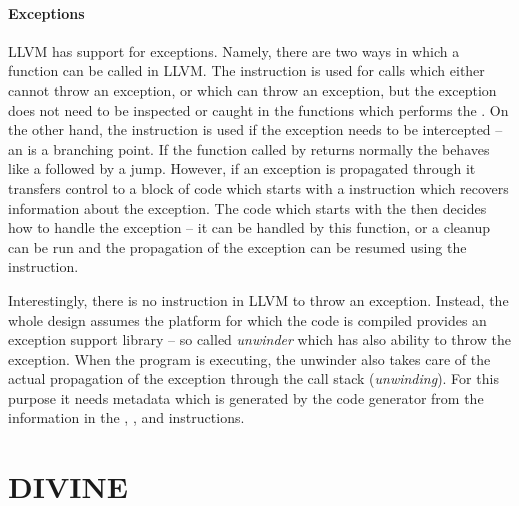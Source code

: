 \paragraph{Exceptions}

LLVM has support for exceptions.
Namely, there are two ways in which a function can be called in LLVM.
The  instruction is used for calls which either cannot throw an
exception, or which can throw an exception, but the exception does not need to
be inspected or caught in the functions which performs the .
On the other hand, the  instruction is used if the exception needs
to be intercepted -- an  is a branching point.
If the function called by  returns normally the  behaves
like a  followed by a jump.
However, if an exception is propagated through  it transfers control
to a block of code which starts with a  instruction which
recovers information about the exception.
The code which starts with the  then decides how to handle the
exception -- it can be handled by this function, or a cleanup can be run and
the propagation of the exception can be resumed using the 
instruction.

Interestingly, there is no instruction in LLVM to throw an exception.
Instead, the whole design assumes the platform for
which the code is compiled provides an exception support library -- so called
\emph{unwinder} which has also ability to throw the exception.
When the program is executing, the unwinder also takes care of the actual
propagation of the exception through the call stack (\emph{unwinding}).
For this purpose it needs metadata which is generated by the code generator
from the information in the , , and 
instructions.

\section{DIVINE}

